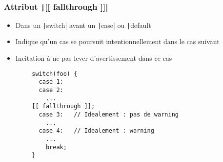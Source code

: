 \documentclass[C++.tex]{subfiles}
\begin{document}
\begin{frame}[fragile]
	\frametitle{Attribut \texttt|[[ fallthrough ]]|}
	\begin{itemize}
		\item Dans un \texttt|switch| avant un \texttt|case| ou \texttt|default|
		\item Indique qu'un cas se poursuit intentionnellement dans le cas suivant
		\item Incitation à ne pas lever d'avertissement dans ce cas
	\end{itemize}

	\begin{verbatim}
		switch(foo) {
		  case 1:
		  case 2:
		    ...
		[[ fallthrough ]];
		  case 3:   // Idealement : pas de warning
		    ...
		  case 4:   // Idealement : warning
		    ...
		    break;
		}
	\end{verbatim}


\end{frame}
\end{document}
